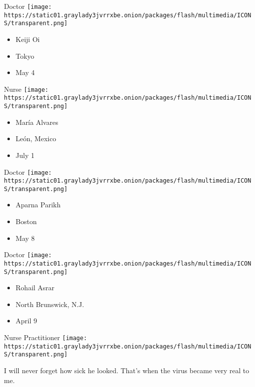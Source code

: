 \protect\hyperlink{item-keiji-oi}{}

Doctor
\texttt{[image: https://static01.graylady3jvrrxbe.onion/packages/flash/multimedia/ICONS/transparent.png]}

\begin{itemize}
\tightlist
\item
  Keiji Oi
\item
  Tokyo
\item
  May 4
\end{itemize}

\protect\hyperlink{item-maria-alvares}{}

Nurse
\texttt{[image: https://static01.graylady3jvrrxbe.onion/packages/flash/multimedia/ICONS/transparent.png]}

\begin{itemize}
\tightlist
\item
  María Alvares
\item
  León, Mexico
\item
  July 1
\end{itemize}

\protect\hyperlink{item-aparna-parikh}{}

Doctor
\texttt{[image: https://static01.graylady3jvrrxbe.onion/packages/flash/multimedia/ICONS/transparent.png]}

\begin{itemize}
\tightlist
\item
  Aparna Parikh
\item
  Boston
\item
  May 8
\end{itemize}

\protect\hyperlink{item-rohail-asrar}{}

Doctor
\texttt{[image: https://static01.graylady3jvrrxbe.onion/packages/flash/multimedia/ICONS/transparent.png]}

\begin{itemize}
\tightlist
\item
  Rohail Asrar
\item
  North Brunswick, N.J.
\item
  April 9
\end{itemize}

\protect\hyperlink{item-patricia-lafontant}{}

Nurse Practitioner
\texttt{[image: https://static01.graylady3jvrrxbe.onion/packages/flash/multimedia/ICONS/transparent.png]}

I will never forget how sick he looked. That's when the virus became
very real to me.

